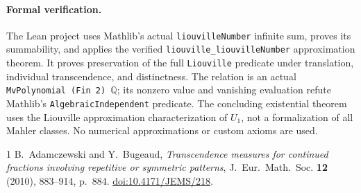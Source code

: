 \documentclass[11pt]{article}
\begin{document}
\paragraph{Formal verification.}
The Lean project uses Mathlib's actual \texttt{liouvilleNumber} infinite sum, proves its summability, and applies the verified \texttt{liouville\_liouvilleNumber} approximation theorem. It proves preservation of the full \texttt{Liouville} predicate under translation, individual transcendence, and distinctness. The relation is an actual \texttt{MvPolynomial (Fin 2) \(\mathbb Q\)}; its nonzero value and vanishing evaluation refute Mathlib's \texttt{AlgebraicIndependent} predicate. The concluding existential theorem uses the Liouville approximation characterization of $U_1$, not a formalization of all Mahler classes. No numerical approximations or custom axioms are used.

\begin{thebibliography}{1}
 B.~Adamczewski and Y.~Bugeaud, \emph{Transcendence measures for continued fractions involving repetitive or symmetric patterns}, J.~Eur.~Math.~Soc. \textbf{12} (2010), 883--914, p.~884. \href{https://doi.org/10.4171/JEMS/218}{doi:10.4171/JEMS/218}.
\end{thebibliography}
\end{document}
